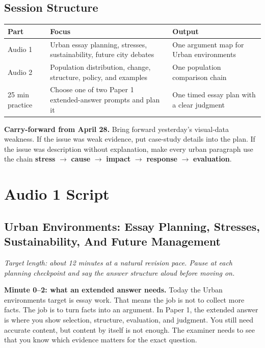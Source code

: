 \documentclass[11pt,a4paper]{article}
\newcommand{\term}[1]{\textcolor{HeadingBlue}{\textbf{#1}}}
\newcommand{\boxnote}[3]{%
\noindent\colorbox{#1}{%
  \begin{minipage}{0.965\textwidth}
  \sffamily
  \textbf{\textcolor{HeadingBlue}{#2}} #3
  \end{minipage}
}}
\begin{document}
\subsection{Session Structure}

\begin{tabularx}{\textwidth}{L{0.18\textwidth}Y L{0.25\textwidth}}
\toprule
\textbf{Part} & \textbf{Focus} & \textbf{Output} \\
\midrule
Audio 1 & Urban essay planning, stresses, sustainability, future city debates &
One argument map for Urban environments \\
Audio 2 & Population distribution, change, structure, policy, and examples &
One population comparison chain \\
25 min practice & Choose one of two Paper 1 extended-answer prompts and plan it &
One timed essay plan with a clear judgment \\
\bottomrule
\end{tabularx}

\boxnote{SoftTint}{Carry-forward from April 28.}{Bring forward yesterday's
visual-data weakness. If the issue was weak evidence, put case-study details
into the plan. If the issue was description without explanation, make every
urban paragraph use the chain \term{stress} $\rightarrow$ \term{cause}
$\rightarrow$ \term{impact} $\rightarrow$ \term{response} $\rightarrow$
\term{evaluation}.}

\section{Audio 1 Script}

\subsection{Urban Environments: Essay Planning, Stresses, Sustainability, And Future Management}

\textit{Target length: about 12 minutes at a natural revision pace. Pause at
each planning checkpoint and say the answer structure aloud before moving on.}

\textbf{Minute 0--2: what an extended answer needs.}
Today the Urban environments target is essay work. That means the job is not to
collect more facts. The job is to turn facts into an argument. In Paper 1, the
extended answer is where you show selection, structure, evaluation, and
judgment. You still need accurate content, but content by itself is not enough.
The examiner needs to see that you know which evidence matters for the exact
question.
\end{document}
